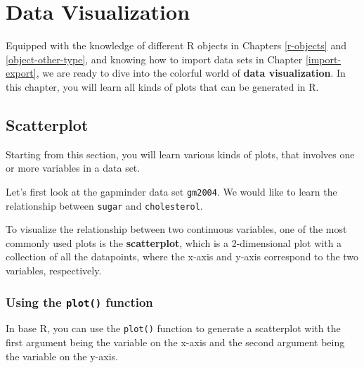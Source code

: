 \documentclass[
]{book}
\newenvironment{Shaded}{\begin{snugshade}}{\end{snugshade}}
\newcommand{\FunctionTok}[1]{\textcolor[rgb]{0.00,0.00,0.00}{#1}}
\newcommand{\NormalTok}[1]{#1}
\newcommand{\SpecialCharTok}[1]{\textcolor[rgb]{0.00,0.00,0.00}{#1}}
\begin{document}
\hypertarget{data-visualization}{%
\chapter{Data Visualization}\label{data-visualization}}

Equipped with the knowledge of different R objects in Chapters \ref{r-objects} and \ref{object-other-type}, and knowing how to import data sets in Chapter \ref{import-export}, we are ready to dive into the colorful world of \textbf{data visualization}. In this chapter, you will learn all kinds of plots that can be generated in R.

\hypertarget{scatterplot}{%
\section{Scatterplot}\label{scatterplot}}

Starting from this section, you will learn various kinds of plots, that involves one or more variables in a data set.

Let's first look at the gapminder data set \texttt{gm2004}. We would like to learn the relationship between \texttt{sugar} and \texttt{cholesterol}.

To visualize the relationship between two continuous variables, one of the most commonly used plots is the \textbf{scatterplot}, which is a 2-dimensional plot with a collection of all the datapoints, where the x-axis and y-axis correspond to the two variables, respectively.

\hypertarget{using-the-plot-function}{%
\subsection{\texorpdfstring{Using the \texttt{plot()} function}{Using the plot() function}}\label{using-the-plot-function}}

In base R, you can use the \texttt{plot()} function to generate a scatterplot with the first argument being the variable on the x-axis and the second argument being the variable on the y-axis.

\begin{Shaded}
\end{Shaded}
\end{document}
